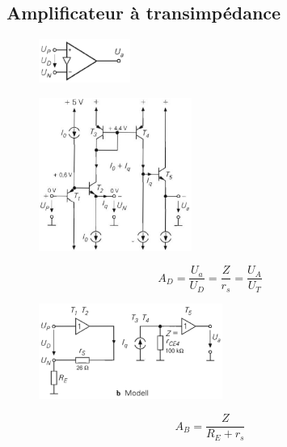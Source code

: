 \documentclass[resume]{subfiles}
\begin{document}
\begin{multicols}{3}
\subsection{Amplificateur à transimpédance}
\begin{figure}[H]
\centering
\includegraphics[width=3.00cm]{img_57.png}
\end{figure}
\begin{figure}[H]
\centering
\includegraphics[width=5cm]{img_56.png}
\end{figure}
$$A_D=\frac{U_a}{U_D}=\frac{Z}{r_s}=\frac{U_A}{U_T}$$
\begin{figure}[H]
\centering
\includegraphics[width=6.00cm]{img_58.png}
\end{figure}
$$A_B=\frac{Z}{R_E+r_s}$$

\end{multicols}
\end{document}
